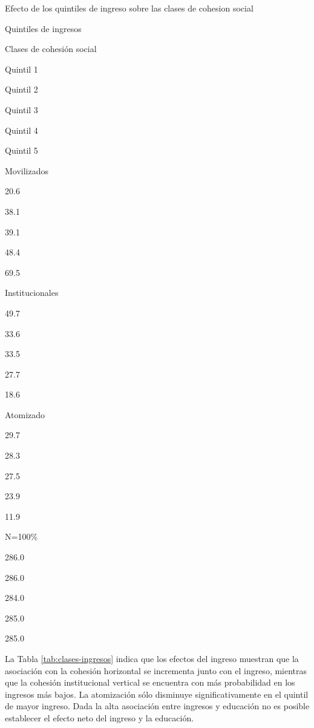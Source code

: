 \documentclass[
  12pt,
]{book}
\begin{document}
\label{tab:clases-ingresos}Efecto de los quintiles de ingreso sobre las clases de cohesion social

Quintiles de ingresos

Clases de cohesión social

Quintil 1

Quintil 2

Quintil 3

Quintil 4

Quintil 5

Movilizados

20.6

38.1

39.1

48.4

69.5

Institucionales

49.7

33.6

33.5

27.7

18.6

Atomizado

29.7

28.3

27.5

23.9

11.9

N=100\%

286.0

286.0

284.0

285.0

285.0

La Tabla \ref{tab:clases-ingresos} indica que los efectos del ingreso muestran que la asociación con la cohesión horizontal se incrementa junto con el ingreso, mientras que la cohesión institucional vertical se encuentra con más probabilidad en los ingresos más bajos. La atomización sólo disminuye significativamente en el quintil de mayor ingreso. Dada la alta asociación entre ingresos y educación no es posible establecer el efecto neto del ingreso y la educación.
\end{document}
